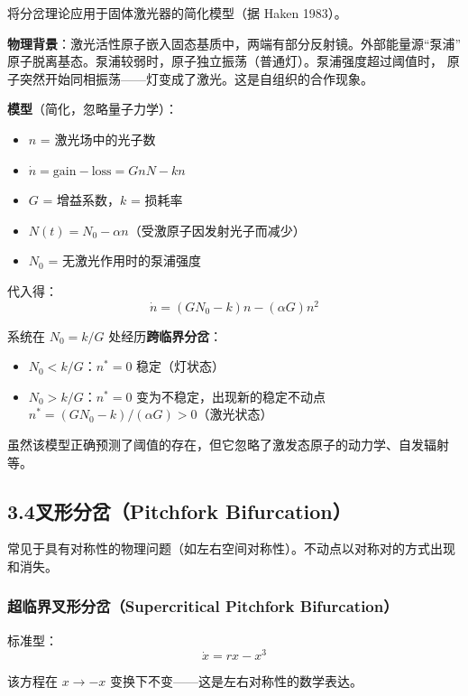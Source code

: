 \documentclass[12pt,a4paper]{article}
\begin{document}
将分岔理论应用于固体激光器的简化模型（据 Haken 1983）。

\textbf{物理背景}：激光活性原子嵌入固态基质中，两端有部分反射镜。外部能量源``泵浦''
原子脱离基态。泵浦较弱时，原子独立振荡（普通灯）。泵浦强度超过阈值时，
原子突然开始同相振荡——灯变成了激光。这是自组织的合作现象。

\textbf{模型}（简化，忽略量子力学）：
\begin{itemize}[nosep]
  \item $n$ = 激光场中的光子数
  \item $\dot{n} = \text{gain} - \text{loss} = GnN - kn$
  \item $G$ = 增益系数，$k$ = 损耗率
  \item $N(t) = N_0 - \alpha n$（受激原子因发射光子而减少）
  \item $N_0$ = 无激光作用时的泵浦强度
\end{itemize}

代入得：
\begin{equation}
\dot{n} = (GN_0 - k)n - (\alpha G)n^2
\end{equation}

系统在 $N_0 = k/G$ 处经历\textbf{跨临界分岔}：
\begin{itemize}[nosep]
  \item $N_0 < k/G$：$n^* = 0$ 稳定（灯状态）
  \item $N_0 > k/G$：$n^* = 0$ 变为不稳定，出现新的稳定不动点
        $n^* = (GN_0 - k)/(\alpha G) > 0$（激光状态）
\end{itemize}

虽然该模型正确预测了阈值的存在，但它忽略了激发态原子的动力学、自发辐射等。

\subsection{3.4\quad 叉形分岔（Pitchfork Bifurcation）}

常见于具有对称性的物理问题（如左右空间对称性）。不动点以对称对的方式出现和消失。

\subsubsection{超临界叉形分岔（Supercritical Pitchfork Bifurcation）}

标准型：
\begin{equation}
\dot{x} = rx - x^3
\end{equation}

该方程在 $x \to -x$ 变换下不变——这是左右对称性的数学表达。
\end{document}

